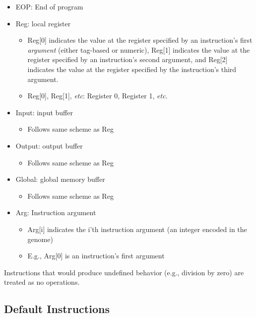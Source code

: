 \documentclass[]{book}
\providecommand{\tightlist}{%
  \setlength{\itemsep}{0pt}\setlength{\parskip}{0pt}}
\begin{document}
\begin{itemize}
\tightlist
\item
  EOP: End of program
\item
  Reg: local register

  \begin{itemize}
  \tightlist
  \item
    Reg{[}0{]} indicates the value at the register specified by an instruction's first \emph{argument} (either tag-based or numeric), Reg{[}1{]} indicates the value at the register specified by an instruction's second argument, and Reg{[}2{]} indicates the value at the register specified by the instruction's third argument.
  \item
    Reg{[}0{]}, Reg{[}1{]}, \emph{etc}: Register 0, Register 1, \emph{etc.}
  \end{itemize}
\item
  Input: input buffer

  \begin{itemize}
  \tightlist
  \item
    Follows same scheme as Reg
  \end{itemize}
\item
  Output: output buffer

  \begin{itemize}
  \tightlist
  \item
    Follows same scheme as Reg
  \end{itemize}
\item
  Global: global memory buffer

  \begin{itemize}
  \tightlist
  \item
    Follows same scheme as Reg
  \end{itemize}
\item
  Arg: Instruction argument

  \begin{itemize}
  \tightlist
  \item
    Arg{[}i{]} indicates the i'th instruction argument (an integer encoded in the genome)
  \item
    E.g., Arg{[}0{]} is an instruction's first argument
  \end{itemize}
\end{itemize}

Instructions that would produce undefined behavior (e.g., division by zero) are treated as no operations.

\hypertarget{default-instructions}{%
\subsection{Default Instructions}\label{default-instructions}}
\end{document}
